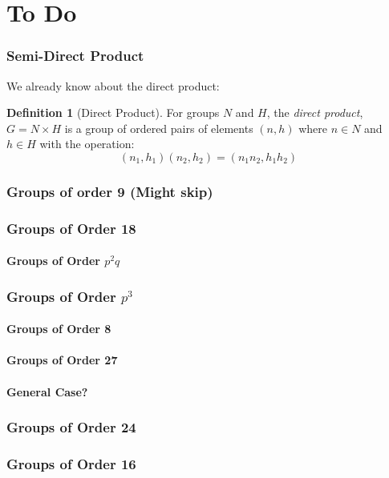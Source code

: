 \documentclass[a4paper, oneside, 12pt, final]{article}
\newtheorem{theorem}{Theorem}[section]
\theoremstyle{definition}
\newtheorem{definition}[theorem]{Definition}
\DeclareMathOperator{\Aut}{Aut}
\begin{document}

\part{To Do}

\section{Semi-Direct Product}
We already know about the direct product:

\begin{definition}[Direct Product]
    For groups \(N\) and \(H\), the \emph{direct product}, \(G = N\times H\) is a
    group of ordered pairs of elements \((n, h)\) where \(n \in N\) and \(h \in
    H\) with the operation: \[(n_1, h_1)(n_2, h_2) = (n_1n_2, h_1h_2)\]
\end{definition}
%
%
%

\section{Groups of order 9 (Might skip)}



\section{Groups of Order 18}
\subsection{Groups of Order \(p^2q\)}

\section{Groups of Order \(p^3\)}
\subsection{Groups of Order 8}
\subsection{Groups of Order 27}
\subsection{General Case?}

\section{Groups of Order 24}

\section{Groups of Order 16}
\end{document}

